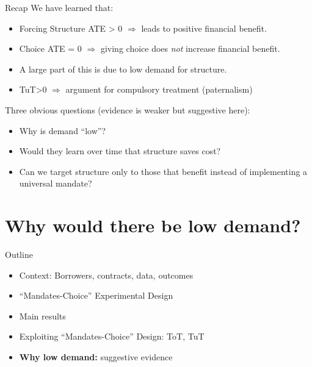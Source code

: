 \documentclass[9pt, aspectratio=169]{beamer}
\begin{document}


\begin{frame}{Recap}
We have learned that:
\begin{itemize}
     \item Forcing Structure ATE > 0 $\Rightarrow$ leads to positive financial benefit. 
    \pause \vfill \item   Choice ATE = 0 $\Rightarrow$  giving choice does \textit{not} increase financial benefit. 
    \pause \vfill \item A large part of this is due to low demand for structure.
    \pause \vfill\item TuT>0 $\Rightarrow$ argument for compulsory treatment \alert{(paternalism)}
\end{itemize}
    \pause  \vfill Three obvious questions (evidence is weaker but suggestive here):
    \begin{itemize}
        \item Why is demand ``low''?
        \item Would they learn over time that structure saves cost? 
        \item Can we target structure only to those that benefit instead of implementing a universal mandate?
    \end{itemize}
\end{frame}


\section{Why would there be low demand?}

\begin{frame}{Outline}
     \large   
     \begin{itemize}
        \item Context: Borrowers, contracts, data, outcomes
         \item \vfill ``Mandates-Choice'' Experimental Design
         \vfill\item Main results
          \vfill\item Exploiting ``Mandates-Choice'' Design: ToT, TuT
         \vfill\item \textbf{Why low demand:} suggestive evidence
         
     \end{itemize}
\end{frame}
\end{document}
